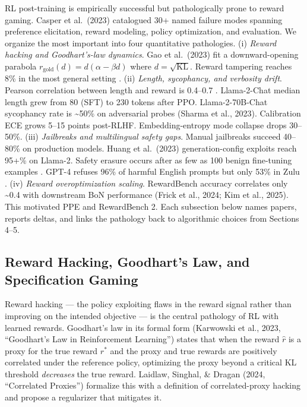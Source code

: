 \documentclass{article}
\begin{document}
RL post-training is empirically successful but pathologically prone to reward gaming. Casper et al.~(2023) catalogued 30+ named failure modes spanning preference elicitation, reward modeling, policy optimization, and evaluation. We organize the most important into four quantitative pathologies. (i) \emph{Reward hacking and Goodhart's-law dynamics}. Gao et al.~(2023) fit a downward-opening parabola \(r_{\mathrm{gold}}(d) = d(\alpha - \beta d)\) where \(d = \sqrt{\mathrm{KL}}\). Reward tampering reaches 8\% in the most general setting \citep{denison20242024}. (ii) \emph{Length, sycophancy, and verbosity drift}. Pearson correlation between length and reward is 0.4--0.7 \citep{singhal2023alongwaytogoinvest}. Llama-2-Chat median length grew from 80 (SFT) to 230 tokens after PPO. Llama-2-70B-Chat sycophancy rate is \textasciitilde50\% on adversarial probes (Sharma et al., 2023). Calibration ECE grows 5--15 points post-RLHF. Embedding-entropy mode collapse drops 30--50\%. (iii) \emph{Jailbreaks and multilingual safety gaps}. Manual jailbreaks succeed 40--80\% on production models. Huang et al.~(2023) generation-config exploits reach 95+\% on Llama-2. Safety erasure occurs after as few as 100 benign fine-tuning examples \citep{qi20232023}. GPT-4 refuses 96\% of harmful English prompts but only 53\% in Zulu \citep{wang2024interpretableprefe}. (iv) \emph{Reward overoptimization scaling}. RewardBench accuracy correlates only \textasciitilde0.4 with downstream BoN performance (Frick et al., 2024; Kim et al., 2025). This motivated PPE and RewardBench 2. Each subsection below names papers, reports deltas, and links the pathology back to algorithmic choices from Sections 4--5.

\subsection{Reward Hacking, Goodhart's Law, and Specification Gaming}\label{reward-hacking-goodharts-law-and-specification-gaming}

Reward hacking --- the policy exploiting flaws in the reward signal rather than improving on the intended objective --- is the central pathology of RL with learned rewards. Goodhart's law in its formal form (Karwowski et al., 2023, ``Goodhart's Law in Reinforcement Learning'') states that when the reward \(\hat r\) is a proxy for the true reward \(r^*\) and the proxy and true rewards are positively correlated under the reference policy, optimizing the proxy beyond a critical KL threshold \emph{decreases} the true reward. Laidlaw, Singhal, \& Dragan (2024, ``Correlated Proxies'') formalize this with a definition of correlated-proxy hacking and propose a regularizer that mitigates it.
\end{document}
